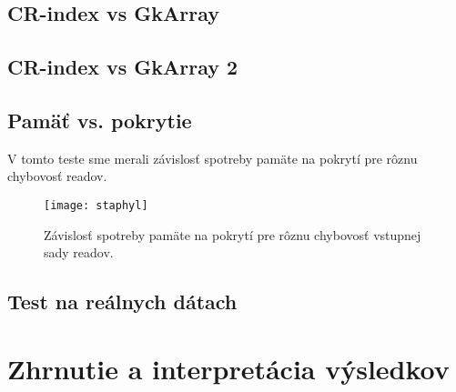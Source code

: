 \subsection{CR-index vs GkArray}

\subsection{CR-index vs GkArray 2}

\subsection{Pamäť vs. pokrytie}
V tomto teste sme merali závislosť spotreby pamäte na pokrytí pre rôznu chybovosť readov. 

\begin{figure}[h]
    \centering
    \texttt{[image: staphyl]}
    \caption{Závislosť spotreby pamäte na pokrytí pre rôznu chybovosť vstupnej sady readov.}
    \label{fig:graf_staphyl}
\end{figure}

\subsection{Test na reálnych dátach}

\section{Zhrnutie a interpretácia výsledkov}

\\
 \\
 \\
 \\
 \\
